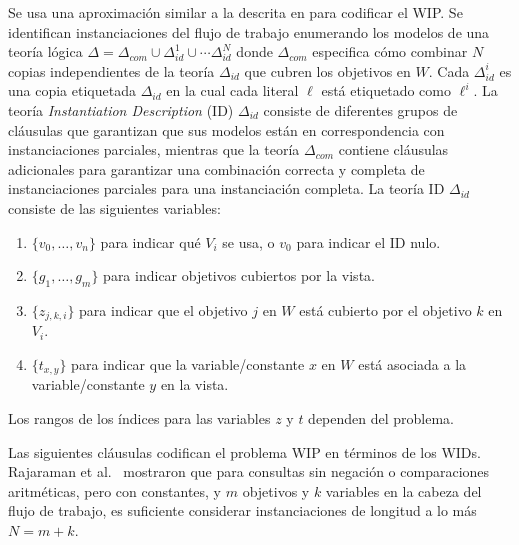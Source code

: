 Se usa una aproximación similar a la descrita en
\cite{arvelo:aaai06} para codificar el WIP. 
Se identifican instanciaciones del flujo de trabajo enumerando los modelos de
una teoría lógica
$\Delta=\Delta_{com}\cup\Delta_{id}^1\cup\cdots\Delta_{id}^N$
donde $\Delta_{com}$ especifica cómo combinar $N$ copias independientes de la teoría
$\Delta_{id}$ que cubren los objetivos en $W$.
Cada $\Delta^i_{id}$ es una copia etiquetada $\Delta_{id}$ en la cual cada
literal 
$\ell$ está etiquetado como $\ell^i$.
La teoría \emph{Instantiation Description} (ID) $\Delta_{id}$ consiste de
diferentes grupos de cláusulas que garantizan que sus modelos están en
correspondencia con instanciaciones parciales, mientras que la teoría
$\Delta_{com}$ contiene cláusulas adicionales para garantizar una combinación
correcta y completa de instanciaciones parciales para una instanciación
completa.
La teoría ID $\Delta_{id}$ consiste de las siguientes variables:

\begin{enumerate}[--]
\item $\{v_0,\ldots,v_n\}$ para indicar qué $V_i$ se usa, o $v_0$ para indicar el ID nulo.
\item $\{g_1,\ldots,g_m\}$ para indicar objetivos cubiertos por la vista.
\item $\{z_{j,k,i}\}$ para indicar que el objetivo $j$ en $W$ está cubierto por el objetivo $k$ en $V_i$.
\item $\{t_{x,y}\}$ para indicar que la variable/constante $x$ en $W$ está asociada a la variable/constante $y$ en la vista.
\end{enumerate}

Los rangos de los índices para las variables $z$ y $t$ dependen del problema.

Las siguientes cláusulas codifican el problema WIP en términos de los WIDs.
Rajaraman et al.\ \cite{RajaramanSU95} mostraron que para consultas sin negación
o comparaciones aritméticas, pero con constantes, y $m$ objetivos y $k$
variables en la cabeza del flujo de trabajo, es suficiente considerar
instanciaciones de longitud a lo más $N=m+k$.


